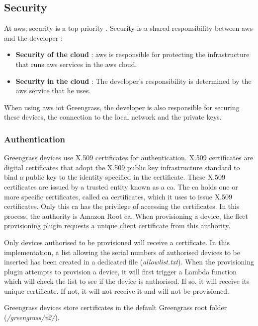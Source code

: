 \subsection{Security}
At \gls{aws}, security is a top priority \cite{aws_iot_greengrass_security}. Security is a shared responsibility between \gls{aws} and the developer :
\begin{itemize}
    \item \textbf{Security of the \gls{cloud}} : \gls{aws} is responsible for protecting the infrastructure that runs \gls{aws} services in the \gls{aws} \gls{cloud}.
    \item \textbf{Security in the \gls{cloud}} : The developer's responsibility is determined by the \gls{aws} service that he uses.
\end{itemize}
When using \gls{aws} \acrshort{iot} Greengrass, the developer is also responsible for securing these devices, the connection to the local network and the private keys.

\subsubsection{Authentication}
Greengrass devices use X.509 certificates for authentication. X.509 certificates are digital certificates that adopt the X.509 public key infrastructure standard to bind a public key to the identity specified in the certificate. These X.509 certificates are issued by a trusted entity known as a \acrfull{ca}. The \acrshort{ca} holds one or more specific certificates, called \acrshort{ca} certificates, which it uses to issue X.509 certificates. Only this \acrshort{ca} has the privilege of accessing the certificates. In this process, the authority is Amazon Root \acrlong{ca}. When \gls{provisioning} a device, the fleet \gls{provisioning} plugin requests a unique client certificate from this authority. \cite{aws_iot_greengrass_security}

Only devices authorised to be provisioned will receive a certificate. In this implementation, a list allowing the serial numbers of authorised devices to be inserted has been created in a dedicated file (\textit{allowlist.txt}). When the \gls{provisioning} plugin attempts to provision a device, it will first trigger a Lambda function which will check the list to see if the device is authorised. If so, it will receive its unique certificate. If not, it will not receive it and will not be provisioned.

Greengrass devices store certificates in the default Greengrass root folder (\textit{/greengrass/v2/}).

